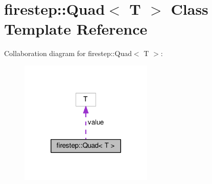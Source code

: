 \hypertarget{classfirestep_1_1_quad}{\section{firestep\+:\+:Quad$<$ T $>$ Class Template Reference}
\label{classfirestep_1_1_quad}
}


Collaboration diagram for firestep\+:\+:Quad$<$ T $>$\+:\nopagebreak
\begin{figure}[H]
\begin{center}
\leavevmode
\includegraphics[width=180pt]{classfirestep_1_1_quad__coll__graph}
\end{center}
\end{figure}
